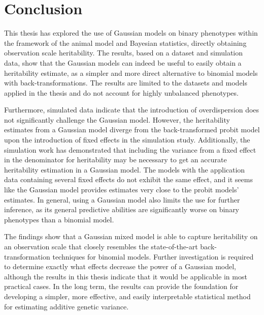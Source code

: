 \chapter{Conclusion}

This thesis has explored the use of Gaussian models on binary phenotypes within the framework of the animal model and Bayesian statistics, directly obtaining observation scale heritability. The results, based on a dataset and simulation data, show that the Gaussian models can indeed be useful to easily obtain a heritability estimate, as a simpler and more direct alternative to binomial models with back-transformations. The results are limited to the datasets and models applied in the thesis and do not account for highly unbalanced phenotypes.

Furthermore, simulated data indicate that the introduction of overdispersion does not significantly challenge the Gaussian model. However, the heritability estimates from a Gaussian model diverge from the back-transformed probit model upon the introduction of fixed effects in the simulation study. Additionally, the simulation work has demonstrated that including the variance from a fixed effect in the denominator for heritability may be necessary to get an accurate heritability estimation in a Gaussian model. The models with the application data containing several fixed effects do not exhibit the same effect, and it seems like the Gaussian model provides estimates very close to the probit models' estimates. In general, using a Gaussian model also limits the use for further inference, as its general predictive abilities are significantly worse on binary phenotypes than a binomial model.

The findings show that a Gaussian mixed model is able to capture heritability on an observation scale that closely resembles the state-of-the-art back-transformation techniques for binomial models. Further investigation is required to determine exactly what effects decrease the power of a Gaussian model, although the results in this thesis indicate that it would be applicable in most practical cases. In the long term, the results can provide the foundation for developing a simpler, more effective, and easily interpretable statistical method for estimating additive genetic variance.